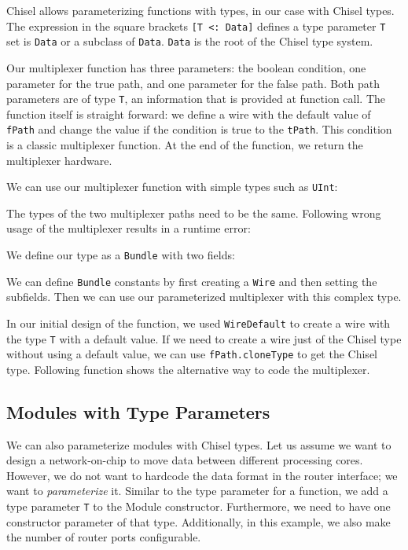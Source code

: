 \documentclass[%
    10pt,
    headinclude, footexclude,
    openright, %
    notitlepage,
    cleardoubleempty,
    headsepline,
    pointlessnumbers,
    bibtotoc, idxtotoc,
    ]{scrbook}
\newcommand{\code}[1]{{\small{\texttt{#1}}}}
\begin{document}

Chisel allows parameterizing functions with types, in our case with Chisel
types. The expression in the square brackets \code{[T <: Data]} defines
a type parameter \code{T} set is \code{Data} or a subclass of \code{Data}.
\code{Data} is the root of the Chisel type system.

Our multiplexer function has three parameters: the boolean condition,
one parameter for the true path, and one parameter for the false path.
Both path parameters are of type \code{T}, an information that is
provided at function call. The function itself is straight forward:
we define a wire with the default value of \code{fPath} and
change the value if the condition is true to the \code{tPath}.
This condition is a classic multiplexer function.
At the end of the function, we return the multiplexer hardware.

We can use our multiplexer function with simple types such as
\code{UInt}:


\noindent The types of the two multiplexer paths need to be the same.
Following wrong usage of the multiplexer results in a runtime error:


\noindent We define our type as a \code{Bundle} with two fields:


\noindent We can define \code{Bundle} constants by first creating
a \code{Wire} and then setting the subfields.
Then we can use our parameterized multiplexer with this complex type.


In our initial design of the function, we used \code{WireDefault}
to create a wire with the type \code{T} with a default value.
If we need to create a wire just of the Chisel type without using a default
value, we can use \code{fPath.cloneType} to get the Chisel type.
Following function shows the alternative way to code the multiplexer.


\subsection{Modules with Type Parameters}

We can also parameterize modules with Chisel types.
Let us assume we want to design a network-on-chip to move data between
different processing cores. However, we do not want to hardcode the
data format in the router interface; we want to \emph{parameterize} it.
Similar to the type parameter for a function, we add a type parameter \code{T}
to the Module constructor. Furthermore, we need to have one constructor
parameter of that type. Additionally, in this example, we also make the number
of router ports configurable.
\end{document}
